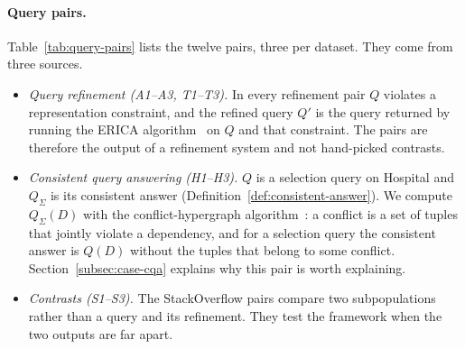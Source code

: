 \paragraph{Query pairs.}
Table~\ref{tab:query-pairs} lists the twelve pairs, three per dataset. They come from three sources.
\begin{itemize}[leftmargin=*,itemsep=1pt,topsep=2pt]
  \item \emph{Query refinement (A1--A3, T1--T3).} In every refinement pair $Q$ violates a representation constraint, and the refined query $Q'$ is the query returned by running the ERICA algorithm~\cite{LMSJ23,ERICA} on $Q$ and that constraint. The pairs are therefore the output of a refinement system and not hand-picked contrasts.
  \item \emph{Consistent query answering (H1--H3).} $Q$ is a selection query on Hospital and $Q_\Sigma$ is its consistent answer (Definition~\ref{def:consistent-answer}). We compute $Q_\Sigma(D)$ with the conflict-hypergraph algorithm~\cite{chomicki2004}: a conflict is a set of tuples that jointly violate a dependency, and for a selection query the consistent answer is $Q(D)$ without the tuples that belong to some conflict. Section~\ref{subsec:case-cqa} explains why this pair is worth explaining.
  \item \emph{Contrasts (S1--S3).} The StackOverflow pairs compare two subpopulations rather than a query and its refinement. They test the framework when the two outputs are far apart.
\end{itemize}

